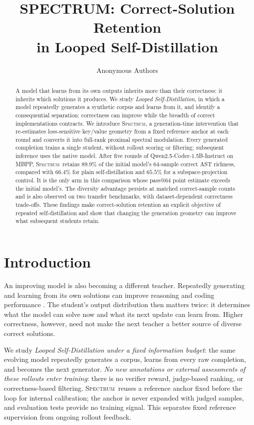 \documentclass{article}
\title{SPECTRUM: Correct-Solution Retention\\in Looped Self-Distillation}
\author{Anonymous Authors}
\newcommand{\method}{\textsc{Spectrum}}
\begin{document}
\maketitle

\begin{abstract}
A model that learns from its own outputs inherits more than their correctness: it inherits which solutions it produces. We study \emph{Looped Self-Distillation}, in which a model repeatedly generates a synthetic corpus and learns from it, and identify a consequential separation: correctness can improve while the breadth of correct implementations contracts. We introduce \method, a generation-time intervention that re-estimates loss-sensitive key/value geometry from a fixed reference anchor at each round and converts it into full-rank proximal spectral modulation. Every generated completion trains a single student, without rollout scoring or filtering; subsequent inference uses the native model. After five rounds of Qwen2.5-Coder-1.5B-Instruct on MBPP, \method\ retains $89.9\%$ of the initial model's 64-sample correct AST richness, compared with $66.4\%$ for plain self-distillation and $65.5\%$ for a subspace-projection control. It is the only arm in this comparison whose pass@64 point estimate exceeds the initial model's. The diversity advantage persists at matched correct-sample counts and is also observed on two transfer benchmarks, with dataset-dependent correctness trade-offs. These findings make correct-solution retention an explicit objective of repeated self-distillation and show that changing the generation geometry can improve what subsequent students retain.
\end{abstract}

\section{Introduction}
\label{sec:intro}
An improving model is also becoming a different teacher. Repeatedly generating and learning from its own solutions can improve reasoning and coding performance \citep{zelikman2022star,singh2024restem}. The student's output distribution then matters twice: it determines what the model can solve now and what its next update can learn from. Higher correctness, however, need not make the next teacher a better source of diverse correct solutions.

We study \emph{Looped Self-Distillation under a fixed information budget}: the same evolving model repeatedly generates a corpus, learns from every raw completion, and becomes the next generator. \emph{No new annotations or external assessments of these rollouts enter training}: there is no verifier reward, judge-based ranking, or correctness-based filtering. \method\ reuses a reference anchor fixed before the loop for internal calibration; the anchor is never expanded with judged samples, and evaluation tests provide no training signal. This separates fixed reference supervision from ongoing rollout feedback.
\end{document}
